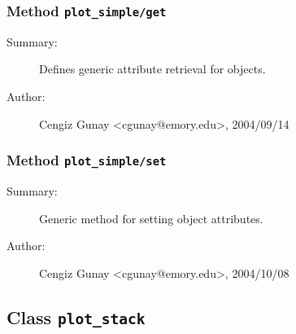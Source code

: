 \subsubsection[Method \texttt{get}]{Method \texttt{plot\_simple/get}}%
%
\label{ref_plot_simple__get}%
\hypertarget{ref_plot_simple__get}{}%
\begin{description}
\item[Summary:]Defines generic attribute retrieval for objects.
%
%
%
%
%
%
%
\item[Author:]%
Cengiz Gunay <cgunay@emory.edu>, 2004/09/14
%
\end{description}
\methodline%
\subsubsection[Method \texttt{set}]{Method \texttt{plot\_simple/set}}%
%
\label{ref_plot_simple__set}%
\hypertarget{ref_plot_simple__set}{}%
\begin{description}
\item[Summary:]Generic method for setting object attributes.
%
%
%
%
%
%
%
\item[Author:]%
Cengiz Gunay <cgunay@emory.edu>, 2004/10/08
%
\end{description}
\methodline%
\subsection{Class \texttt{plot\_stack}}%
%
\label{ref_plot_stack}%
\hypertarget{ref_plot_stack}{}%

